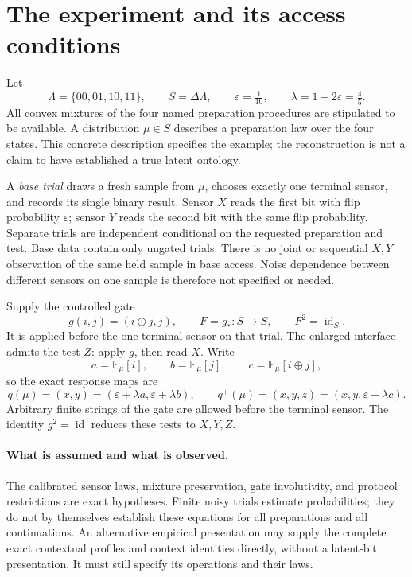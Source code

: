 \documentclass[11pt]{article}
\theoremstyle{definition}
\newcommand{\id}{\operatorname{id}}
\newcommand{\eps}{\varepsilon}
\begin{document}
\section{The experiment and its access conditions}
\label{sec:setup}
Let
\[
 \Lambda=\{00,01,10,11\},\qquad S=\Delta\Lambda,
 \qquad \eps=\tfrac1{10},\qquad \lambda=1-2\eps=\tfrac45.
\]
All convex mixtures of the four named preparation procedures are stipulated to be available. A distribution $\mu\in S$ describes a preparation law over the four states. This concrete description specifies the example; the reconstruction is not a claim to have established a true latent ontology.

A \emph{base trial} draws a fresh sample from $\mu$, chooses exactly one terminal sensor, and records its single binary result. Sensor $X$ reads the first bit with flip probability $\eps$; sensor $Y$ reads the second bit with the same flip probability. Separate trials are independent conditional on the requested preparation and test. Base data contain only ungated trials. There is no joint or sequential $X,Y$ observation of the same held sample in base access. Noise dependence between different sensors on one sample is therefore not specified or needed.

Supply the controlled gate
\[
 g(i,j)=(i\mathbin{\oplus}j,j),\qquad F=g_*:S\longrightarrow S,
 \qquad F^2=\id_S.
\]
It is applied before the one terminal sensor on that trial. The enlarged interface admits the test $Z$: apply $g$, then read $X$. Write
\[
 a=\mathbb E_\mu[i],\qquad b=\mathbb E_\mu[j],\qquad
 c=\mathbb E_\mu[i\mathbin{\oplus}j],
\]
so the exact response maps are
\begin{equation}\label{eq:profiles}
 q(\mu)=(x,y)=(\eps+\lambda a,\eps+\lambda b),\qquad
 q^+(\mu)=(x,y,z)=(x,y,\eps+\lambda c).
\end{equation}
Arbitrary finite strings of the gate are allowed before the terminal sensor. The identity $g^2=\id$ reduces these tests to $X,Y,Z$.

\paragraph{What is assumed and what is observed.}
The calibrated sensor laws, mixture preservation, gate involutivity, and protocol restrictions are exact hypotheses. Finite noisy trials estimate probabilities; they do not by themselves establish these equations for all preparations and all continuations. An alternative empirical presentation may supply the complete exact contextual profiles and context identities directly, without a latent-bit presentation. It must still specify its operations and their laws.
\end{document}
